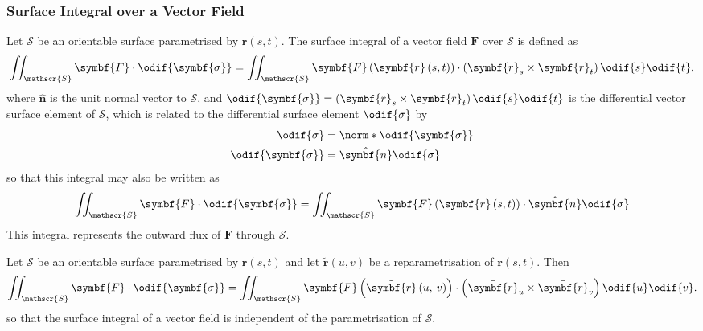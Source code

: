 \documentclass{article}
\begin{document}
\subsubsection{Surface Integral over a Vector Field}
Let \(\mathscr{S}\) be an orientable surface parametrised by
\(\symbf{r}\left( s, t \right)\). The surface integral of a vector
field \(\symbf{F}\) over \(\mathscr{S}\) is defined as
\begin{equation*}
    \iint_{\mathscr{S}} \symbf{F} \cdot \odif{\symbf{\sigma}} =
    \iint_{\mathscr{S}} \symbf{F}\left( \symbf{r}\left( s, t \right) \right) \cdot \left( \symbf{r}_s \times \symbf{r}_t \right) \odif{s} \odif{t}.
\end{equation*}
where \(\hat{\symbf{n}}\) is the unit normal vector to \(\mathscr{S}\),
and \(\odif{\symbf{\sigma}} = \left( \symbf{r}_s \times \symbf{r}_t \right) \odif{s}\odif{t}\)
is the differential vector surface element of \(\mathscr{S}\), which is
related to the differential surface element \(\odif{\sigma}\) by
\begin{align*}
    \odif{\sigma}         & = \norm*{\odif{\symbf{\sigma}}} \\
    \odif{\symbf{\sigma}} & = \hat{\symbf{n}} \odif{\sigma}
\end{align*}
so that this integral may also be written as
\begin{equation*}
    \iint_{\mathscr{S}} \symbf{F} \cdot \odif{\symbf{\sigma}} =
    \iint_{\mathscr{S}} \symbf{F}\left( \symbf{r}\left( s, t \right) \right) \cdot \hat{\symbf{n}} \odif{\sigma}
\end{equation*}
This integral represents the outward flux of \(\symbf{F}\) through
\(\mathscr{S}\).
\begin{lemma}
    Let \(\mathscr{S}\) be an orientable surface parametrised by \(\symbf{r}\left( s, t \right)\)
    and let \(\tilde{\symbf{r}}\left( u, v \right)\) be a reparametrisation
    of \(\symbf{r}\left( s, t \right)\). Then
    \begin{equation*}
        \iint_{\mathscr{S}} \symbf{F} \cdot \odif{\symbf{\sigma}} = \iint_{\mathscr{S}} \symbf{F}\left( \tilde{\symbf{r}}\left( u,\: v \right) \right) \cdot \left( \tilde{\symbf{r}}_u \times \tilde{\symbf{r}}_v \right) \odif{u} \odif{v}.
    \end{equation*}
    so that the surface integral of a vector field is independent of the
    parametrisation of \(\mathscr{S}\).
\end{lemma}
\end{document}
